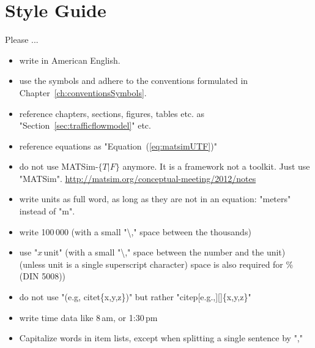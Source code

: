 



\section*{Style Guide}
\label{sec:styleguide}

Please ...

\begin{itemize}

\item write in American English.

\item use the symbols and adhere to the conventions formulated in Chapter~\ref{ch:conventionsSymbols}.

\item reference chapters, sections, figures, tables etc. as "Section~\ref{sec:trafficflowmodel}" etc.

\item reference equations as "Equation~(\ref{eq:matsimUTF})"

\item do not use MATSim-$\{T\lvert F\}$ anymore. It is a framework not a toolkit. Just use "MATSim". \url{http://matsim.org/conceptual-meeting/2012/notes}

\item write units as full word, as long as they are not in an equation: "meters" instead of "m".

\item write 100\,000 (with a small "\textbackslash," space between the thousands)

\item use "$x$\,unit" (with a small "\textbackslash," space between the number and the unit) (unless unit is a single superscript character) space is also required for \% (DIN 5008))

\item do not use "(e.g, citet\{x,y,z\})" but rather "citep[e.g.,][]\{x,y,z\}"

\item write time data like 8\,am, or 1:30\,pm

\item Capitalize words in item lists, except when splitting a single sentence by ","

\end{itemize}

